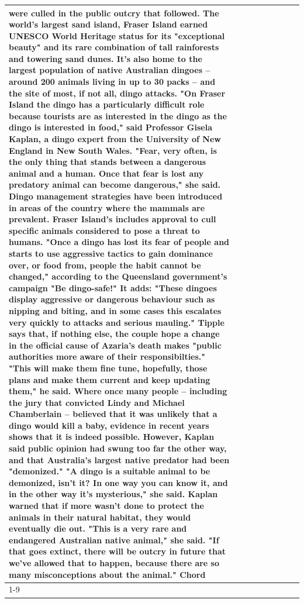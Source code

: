 \begin{table}[H]
\begin{tabular}{lllrlllll}
were culled in the public outcry that followed. The world's largest sand island, Fraser Island earned UNESCO World Heritage status for its "exceptional beauty" and its rare combination of tall rainforests and towering sand dunes. It's also home to the largest population of native Australian dingoes -- around 200 animals living in up to 30 packs -- and the site of most, if not all, dingo attacks. "On Fraser Island the dingo has a particularly difficult role because tourists are as interested in the dingo as the dingo is interested in food," said Professor Gisela Kaplan, a dingo expert from the University of New England in New South Wales. "Fear, very often, is the only thing that stands between a dangerous animal and a human. Once that fear is lost any predatory animal can become dangerous," she said. Dingo management strategies have been introduced in areas of the country where the mammals are prevalent. Fraser Island's includes approval to cull specific animals considered to pose a threat to humans. "Once a dingo has lost its fear of people and starts to use aggressive tactics to gain dominance over, or food from, people the habit cannot be changed," according to the Queensland government's campaign "Be dingo-safe!" It adds: "These dingoes display aggressive or dangerous behaviour such as nipping and biting, and in some cases this escalates very quickly to attacks and serious mauling." Tipple says that, if nothing else, the couple hope a change in the official cause of Azaria's death makes "public authorities more aware of their responsibilties." "This will make them fine tune, hopefully, those plans and make them current and keep updating them," he said. Where once many people -- including the jury that convicted Lindy and Michael Chamberlain -- believed that it was unlikely that a dingo would kill a baby, evidence in recent years shows that it is indeed possible. However, Kaplan said public opinion had swung too far the other way, and that Australia's largest native predator had been "demonized." "A dingo is a suitable animal to be demonized, isn't it? In one way you can know it, and in the other way it's mysterious," she said. Kaplan warned that if more wasn't done to protect the animals in their natural habitat, they would eventually die out. "This is a very rare and endangered Australian native animal," she said. "If that goes extinct, there will be outcry in future that we've allowed that to happen, because there are so many misconceptions about the animal." Chord \\
\cline{1-9}

\end{tabular}
\end{table}
